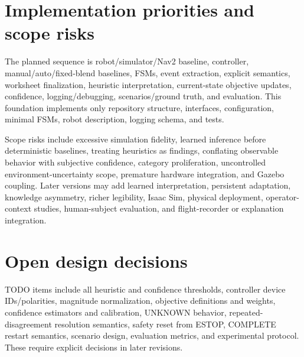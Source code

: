 \documentclass[11pt]{article}
\begin{document}
\section{Implementation priorities and scope risks}
The planned sequence is robot/simulator/Nav2 baseline, controller,
manual/auto/fixed-blend baselines, FSMs, event extraction, explicit semantics,
worksheet finalization, heuristic interpretation, current-state objective
updates, confidence, logging/debugging, scenarios/ground truth, and evaluation.
This foundation implements only repository structure, interfaces,
configuration, minimal FSMs, robot description, logging schema, and tests.

Scope risks include excessive simulation fidelity, learned inference before
deterministic baselines, treating heuristics as findings, conflating observable
behavior with subjective confidence, category proliferation, uncontrolled
environment-uncertainty scope, premature hardware integration, and Gazebo
coupling. Later versions may add learned interpretation, persistent adaptation,
knowledge asymmetry, richer legibility, Isaac Sim, physical deployment,
operator-context studies, human-subject evaluation, and flight-recorder or
explanation integration.

\section{Open design decisions}
TODO items include all heuristic and confidence thresholds, controller device
IDs/polarities, magnitude normalization, objective definitions and weights,
confidence estimators and calibration, UNKNOWN behavior, repeated-disagreement
resolution semantics, safety reset from ESTOP, COMPLETE restart semantics,
scenario design, evaluation metrics, and experimental protocol. These require
explicit decisions in later revisions.
\end{document}
